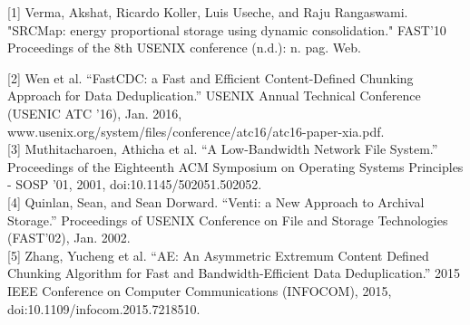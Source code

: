 \documentclass{acmtog} %
\begin{document}
	  \begin{thebibliography}{1}
	  
	   [1] Verma, Akshat, Ricardo Koller, Luis Useche, and Raju Rangaswami. "SRCMap: energy proportional storage using dynamic consolidation." FAST'10 Proceedings of the 8th USENIX conference (n.d.): n. pag. Web.
	  
	   [2] Wen et al. “FastCDC: a Fast and Efficient Content-Defined Chunking Approach for Data Deduplication.” USENIX Annual Technical Conference (USENIC ATC ’16), Jan. 2016, www.usenix.org/system/files/conference/atc16/atc16-paper-xia.pdf. \\

	   [3] Muthitacharoen, Athicha et al. “A Low-Bandwidth Network File System.” Proceedings of the Eighteenth ACM Symposium on Operating Systems Principles - SOSP '01, 2001, doi:10.1145/502051.502052. \\

	   [4] Quinlan, Sean, and Sean Dorward. “Venti: a New Approach to Archival Storage.” Proceedings of USENIX Conference on File and Storage Technologies (FAST’02), Jan. 2002. \\

	   [5] Zhang, Yucheng et al. “AE: An Asymmetric Extremum Content Defined Chunking Algorithm for Fast and Bandwidth-Efficient Data Deduplication.” 2015 IEEE Conference on Computer Communications (INFOCOM), 2015, doi:10.1109/infocom.2015.7218510. \\

	  \end{thebibliography}

	
		
	
\end{document}
